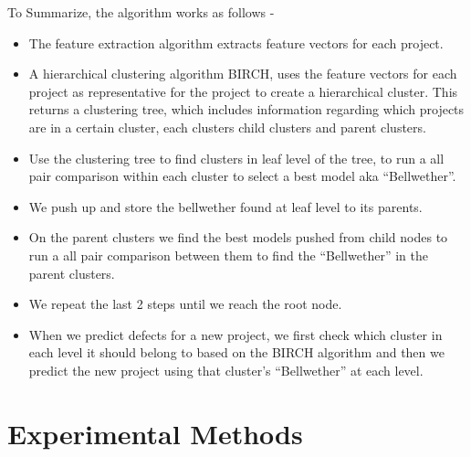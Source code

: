 \documentclass[10pt,journal,compsoc]{IEEEtran}
\newcommand{\bi}{\begin{itemize}}
\newcommand{\ei}{\end{itemize}}
\begin{document}

To Summarize, the algorithm works as follows -
\bi
\item The feature extraction algorithm extracts feature vectors for each project.
\item A hierarchical clustering algorithm BIRCH, uses the feature vectors for each project as representative for the project to create a hierarchical cluster. This returns a clustering tree, which includes information regarding which projects are in a certain cluster, each clusters child clusters and parent clusters.
\item Use the clustering tree to find clusters in leaf level of the tree, to run a all pair comparison within each cluster to select a best model aka ``Bellwether''. 
\item We push up and store the bellwether found at leaf level to its parents.
\item On the parent clusters we find the best models pushed from child nodes to run a all pair comparison between them to find the ``Bellwether'' in the parent clusters.
\item We repeat the last 2 steps until we reach the root node.
\item When we predict defects for a new project, we first check which cluster in each level it should belong to based on the BIRCH algorithm and then we predict the new project using that cluster's ``Bellwether'' at each level.
\ei

\section{Experimental Methods}
\label{sec:Data Collection}
\end{document}
